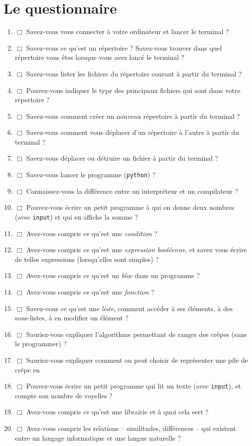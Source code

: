\documentclass[12pt]{article}
\newcommand{\prog}[1]{\texttt{#1}}
\begin{document}
\section{Le questionnaire}
\label{note2}
\begin{enumerate}
\item $\Box$ Savez-vous vous connecter à votre ordinateur et lancer le terminal ?
\item $\Box$ Savez-vous ce qu'est un répertoire ? Savez-vous trouver dans quel répertoire vous êtes lorsque vous avez
lancé le terminal ?
\item $\Box$ Savez-vous lister les fichiers du répertoire courant à partir du terminal ?
\item $\Box$ Pouvez-vous indiquer le type des principaux fichiers qui sont dans votre répertoire ?
\item $\Box$ Savez-vous comment créer un nouveau répertoire à partir du terminal ?
\item $\Box$ Savez-vous comment vous déplacer d'un répertoire à l'autre à partir du terminal ?
\item $\Box$ Savez-vous déplacer ou détruire un fichier à partir du terminal ?
\item $\Box$ Savez-vous lancer le programme \pyth{} (\prog{python}) ?
\item $\Box$ Connaissez-vous la différence entre un interpréteur et un compilateur ?
\item $\Box$ Pouvez-vous écrire un petit programme \pyth{} à qui on donne deux nombres (avec \prog{input}) et qui en affiche la somme ?
\item $\Box$ Avez-vous compris ce qu'est une \emph{condition} ?
\item $\Box$ Avez-vous compris ce qu'est une \emph{expression booléenne}, et savez vous
écrire de telles expressions (lorsqu'elles sont simples) ?
\item $\Box$ Avez-vous compris ce qu'est un \emph{bloc} dans un programme \pyth{} ?
\item $\Box$ Avez-vous compris ce qu'est une \emph{fonction} ?
\item $\Box$ Savez-vous ce qu'est une \emph{liste}, comment accéder à ses éléments, à des sous-listes, à en modifier un élément ?
\item $\Box$ Sauriez-vous expliquer l'algorithme permettant de ranger des crêpes (sans le programmer) ?
\item $\Box$ Sauriez-vous expliquer comment on peut choisir de représenter une pile de crêpe en \pyth{}
\item $\Box$ Pouvez-vous écrire un petit programme qui lit un texte (avec \prog{input}), et compte son nombre de voyelles ?
\item $\Box$ Avez-vous compris ce qu'est une librairie et à quoi cela sert ?
\item $\Box$ Avez-vous compris les relations -- similitudes, différences -- qui existent entre un langage informatique et une
langue naturelle ?
\end{enumerate}
\end{document}

